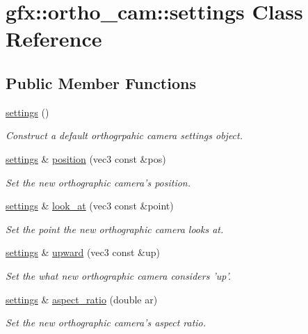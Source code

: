 \hypertarget{classgfx_1_1ortho__cam_1_1settings}{\section{gfx\-:\-:ortho\-\_\-cam\-:\-:settings Class Reference}
\label{classgfx_1_1ortho__cam_1_1settings}
}
\subsection*{Public Member Functions}
\begin{DoxyCompactItemize}
\item 
\hyperlink{classgfx_1_1ortho__cam_1_1settings_a3d13fd5099f4c530bcac851959e357b9}{settings} ()
\begin{DoxyCompactList}\small\item\em Construct a default orthogrpahic camera settings object. \end{DoxyCompactList}\item 
\hyperlink{classgfx_1_1ortho__cam_1_1settings}{settings} \& \hyperlink{classgfx_1_1ortho__cam_1_1settings_a885628ba0df54e8c735e3759951aeed0}{position} (vec3 const \&pos)
\begin{DoxyCompactList}\small\item\em Set the new orthographic camera's position. \end{DoxyCompactList}\item 
\hyperlink{classgfx_1_1ortho__cam_1_1settings}{settings} \& \hyperlink{classgfx_1_1ortho__cam_1_1settings_aad2ca3ff59ad21e3f4655792e2ef562b}{look\-\_\-at} (vec3 const \&point)
\begin{DoxyCompactList}\small\item\em Set the point the new orthographic camera looks at. \end{DoxyCompactList}\item 
\hyperlink{classgfx_1_1ortho__cam_1_1settings}{settings} \& \hyperlink{classgfx_1_1ortho__cam_1_1settings_a5f280c86dc45fd290edbf09a361fc8a7}{upward} (vec3 const \&up)
\begin{DoxyCompactList}\small\item\em Set the what new orthographic camera considers 'up'. \end{DoxyCompactList}\item 
\hyperlink{classgfx_1_1ortho__cam_1_1settings}{settings} \& \hyperlink{classgfx_1_1ortho__cam_1_1settings_af8478e6a356ff147d0f5eb41dfe88cf4}{aspect\-\_\-ratio} (double ar)
\begin{DoxyCompactList}\small\item\em Set the new orthographic camera's aspect ratio. \end{DoxyCompactList}\item 

\end{DoxyCompactItemize}
